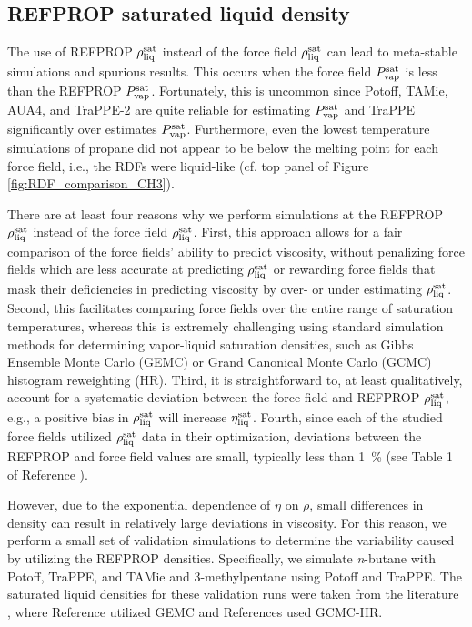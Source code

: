 \documentclass[preprint,review,12pt]{elsarticle}
\begin{document}
	\subsection{REFPROP saturated liquid density}
	
	The use of REFPROP $\rho_{\rm liq}^{\rm sat}$ instead of the force field $\rho_{\rm liq}^{\rm sat}$ can lead to meta-stable simulations and spurious results. This occurs when the force field $P_{\rm vap}^{\rm sat}$ is less than the REFPROP $P_{\rm vap}^{\rm sat}$. Fortunately, this is uncommon since Potoff, TAMie, AUA4, and TraPPE-2 are quite reliable for estimating $P_{\rm vap}^{\rm sat}$ and TraPPE significantly over estimates $P_{\rm vap}^{\rm sat}$. Furthermore, even the lowest temperature simulations of propane did not appear to be below the melting point for each force field, i.e., the RDFs were liquid-like (cf. top panel of Figure \ref{fig:RDF_comparison_CH3}). 
	
	There are at least four reasons why we perform simulations at the REFPROP $\rho_{\rm liq}^{\rm sat}$ instead of the force field $\rho_{\rm liq}^{\rm sat}$. First, this approach allows for a fair comparison of the force fields' ability to predict viscosity, without penalizing force fields which are less accurate at predicting $\rho_{\rm liq}^{\rm sat}$ or rewarding force fields that mask their deficiencies in predicting viscosity by over- or under estimating $\rho_{\rm liq}^{\rm sat}$.
	Second, this facilitates comparing force fields over the entire range of saturation temperatures, whereas this is extremely challenging using standard simulation methods for determining vapor-liquid saturation densities, such as Gibbs Ensemble Monte Carlo (GEMC) or Grand Canonical Monte Carlo (GCMC) histogram reweighting (HR). Third, it is straightforward to, at least qualitatively, account for a systematic deviation between the force field and REFPROP $\rho_{\rm liq}^{\rm sat}$, e.g., a positive bias in $\rho_{\rm liq}^{\rm sat}$ will increase $\eta_{\rm liq}^{\rm sat}$. Fourth, since each of the studied force fields utilized $\rho_{\rm liq}^{\rm sat}$ data in their optimization, deviations between the REFPROP and force field values are small, typically less than 1~\% (see Table 1 of Reference ). 
	
	However, due to the exponential dependence of $\eta$ on $\rho$, small differences in density can result in relatively large deviations in viscosity. For this reason, we perform a small set of validation simulations to determine the variability caused by utilizing the REFPROP densities. Specifically, we simulate \textit{n}-butane with Potoff, TraPPE, and TAMie and 3-methylpentane using Potoff and TraPPE. The saturated liquid densities for these validation runs were taken from the literature \cite{Martin1999,Mie,Potoff_branched,TAMie}, where Reference  utilized GEMC and References  used GCMC-HR.      
	
\end{document}
